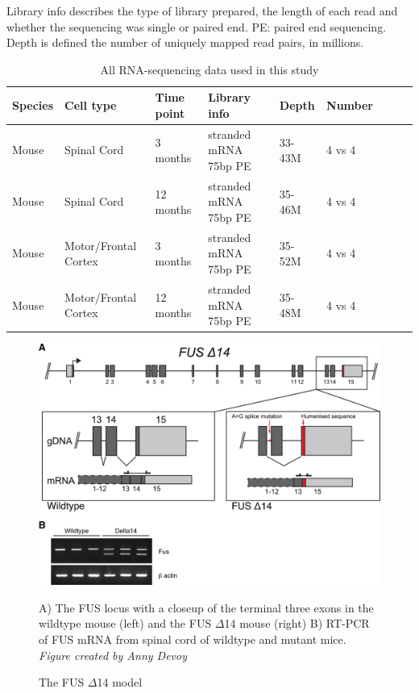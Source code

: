 \begin{table}[h!]
	\caption{All RNA-sequencing data used in this study}
	Library info describes the type of library prepared, the length of each read and whether the sequencing was single or paired end. PE: paired end sequencing. Depth is defined the number of uniquely mapped read pairs, in millions.
	\begin{center}
		\begin{small}
			\begin{tabular}{llllp{1.5cm}llll}
				Species & Cell type & Time point & Library info & Depth & Number\\
				\hline
				Mouse & Spinal Cord & 3 months & stranded mRNA 75bp PE & 33-43M & 4 vs 4\\
				Mouse & Spinal Cord & 12 months & stranded mRNA 75bp PE & 35-46M & 4 vs 4\\ 
				Mouse & Motor/Frontal Cortex & 3 months & stranded mRNA 75bp PE & 35-52M & 4 vs 4\\
				Mouse & Motor/Frontal Cortex & 12 months & stranded mRNA 75bp PE & 35-48M & 4 vs 4\\ 
			\end{tabular}
		\end{small}
	\end{center}
\end{table}

\begin{figure}[h!]
	\begin{center}
		\includegraphics[width=14cm]{Figures/04_fus_mice/anny_FUS_schematic.png}
	\end{center}
	\caption{The FUS $\Delta$14 model }
		A) The FUS locus with a closeup of the terminal three exons in the wildtype mouse (left) and the FUS $\Delta$14 mouse (right) B) RT-PCR of FUS mRNA from spinal cord of wildtype and mutant mice. \textit{Figure created by Anny Devoy}
\end{figure}


